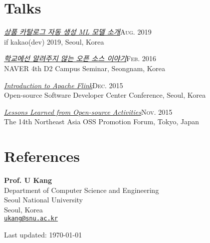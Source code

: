 \documentclass[11pt,a4paper]{article}
\renewenvironment{itemize}{
  \begin{list}{}{
    \setlength{\leftmargin}{1.5em}
    \setlength{\itemsep}{0.5em}
    \setlength{\parskip}{0pt}
    \setlength{\parsep}{0.25em}
  }
}{
  \end{list}
}
\begin{document}
\section*{Talks}
\begin{itemize}
  \item \href{http://j.mp/chiwanpark-ifkakao2019}{\textit{상품 카탈로그 자동 생성 ML 모델 소개}}\hfill\textsc{Aug. 2019}\\
        if kakao(dev) 2019, Seoul, Korea
  \item \href{http://j.mp/d2-campus-seminar-4th-park}{\textit{학교에선 알려주지 않는 오픈 소스 이야기}}\hfill\textsc{Feb. 2016}\\
        NAVER 4th D2 Campus Seminar, Seongnam, Korea
  \item \href{http://j.mp/ossdevconf-2015-park}{\textit{Introduction to Apache Flink}}\hfill\textsc{Dec. 2015}\\
        Open-source Software Developer Center Conference, Seoul, Korea
  \item \href{http://j.mp/cjkossforum-2015-park}{\textit{Lessons Learned from Open-source Activities}}\hfill\textsc{Nov. 2015}\\
        The 14th Northeast Asia OSS Promotion Forum, Tokyo, Japan
\end{itemize}

\section*{References}
\begin{itemize}
  \item \textbf{Prof. U Kang}\\
        Department of Computer Science and Engineering\\
        Seoul National University\\
        Seoul, Korea\\
        \href{mailto:ukang@snu.ac.kr}{\texttt{ukang@snu.ac.kr}}
\end{itemize}

\bigskip
{\small Last updated: \today}
\end{document}
